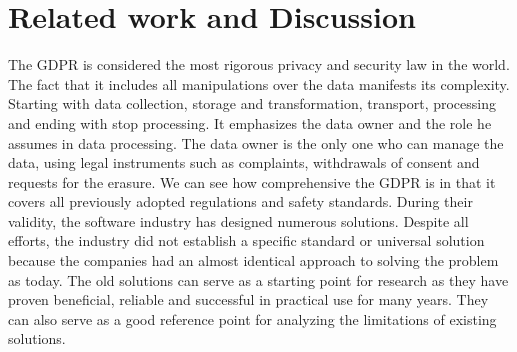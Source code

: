 \documentclass[11pt,english]{article}
\begin{document}
\section{Related work and Discussion}
The GDPR is considered the most rigorous privacy and security law in the world. The fact that it includes all manipulations over the data manifests its complexity. Starting with data collection, storage and transformation, transport, processing and ending with stop processing. It emphasizes the data owner and the role he assumes in data processing. The data owner is the only one who can manage the data, using legal instruments such as complaints, withdrawals of consent and requests for the erasure. We can see how comprehensive the GDPR is in that it covers all previously adopted regulations and safety standards. During their validity, the software industry has designed numerous solutions. Despite all efforts, the industry did not establish a specific standard or universal solution because the companies had an almost identical approach to solving the problem as today. The old solutions can serve as a starting point for research as they have proven beneficial, reliable and successful in practical use for many years. They can also serve as a good reference point for analyzing the limitations of existing solutions.
\end{document}
